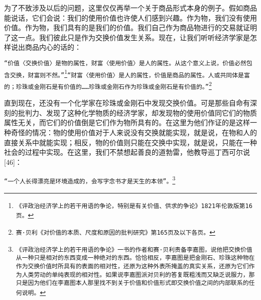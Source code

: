 \documentclass{ctexbook}
\begin{document}
    为了不致涉及以后的问题，这里仅仅再举一个关于商品形式本身的例子。假如商品能说话，它们会说：我们的使用价值也许使人们感到兴趣。作为物，我们没有使用价值。作为物，我们具有的是我们的价值。我们自己作为商品物进行的交易就证明了这一点。我们彼此只是作为交换价值发生关系。现在，让我们听听经济学家是怎样说出商品内心的话的：
    
    \texttt{“价值〈交换价值〉是物的属性，财富〈使用价值〉是人的属性。从这个意义上说，价值必然包含交换，财富则不然。”\footnote{《评政治经济学上的若干用语的争论，特别是有关价值、供求的争论》1821年伦敦版第16页。}“财富〈使用价值〉是人的属性，价值是商品的属性。人或共同体是富的；珍珠或金刚石是有价值的……珍珠或金刚石作为珍珠或金刚石是有价值的。”\footnote{赛·贝利《对价值的本质、尺度和原因的批判研究》第165页及以下各页。}}
    
    直到现在，还没有一个化学家在珍珠或金刚石中发现交换价值。可是那些自命有深刻的批判力、发现了这种化学物质的经济学家，却发现物的使用价值同它们的物质属性无关，而它们的价值倒是它们作为物所具有的。在这里为他们作证的是这样一种奇怪的情况：物的使用价值对于人来说没有交换就能实现，就是说，在物和人的直接关系中就能实现；相反，物的价值则只能在交换中实现，就是说，只能在一种社会的过程中实现。在这里，我们不禁想起善良的道勃雷，他教导巡丁西可尔说[46]：
    
    \texttt{“一个人长得漂亮是环境造成的，会写字念书才是天生的本领”。\footnote{《评政治经济学上的若干用语的争论》一书的作者和赛·贝利责备李嘉图，说他把交换价值从一种只是相对的东西变成一种绝对的东西。恰恰相反，李嘉图是把金刚石、珍珠这种物在作为交换价值时所具有的表面的相对性，还原为这种外表所掩盖的真实关系，还原为它们作为人类劳动的单纯表现的相对性。如果说李嘉图派对贝利的答复既粗浅而又缺乏说服力，那只是因为他们在李嘉图本人那里找不到关于价值和价值形式即交换价值之间的内部联系的任何说明。}}
        
\end{document}
